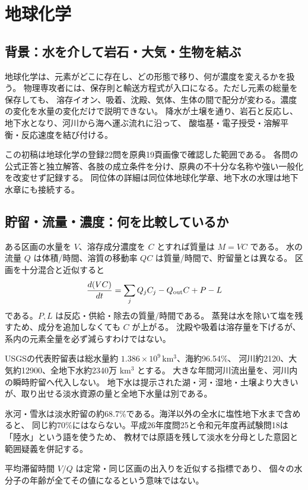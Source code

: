 \chapter{地球化学}
\section{背景：水を介して岩石・大気・生物を結ぶ}
\label{theory:geochemistry:boundary}
地球化学は、元素がどこに存在し、どの形態で移り、何が濃度を変えるかを扱う。
物理専攻者には、保存則と輸送方程式が入口になる。ただし元素の総量を保存しても、
溶存イオン、吸着、沈殿、気体、生体の間で配分が変わる。濃度の変化を水量の変化だけで説明できない。
降水が土壌を通り、岩石と反応し、地下水となり、河川から海へ運ぶ流れに沿って、
酸塩基・電子授受・溶解平衡・反応速度を結び付ける。

この初稿は地球化学の登録22問を原典19頁画像で確認した範囲である。
各問の公式正答と独立解答、各肢の成立条件を分け、原典の不十分な名称や強い一般化を改変せず記録する。
同位体の詳細は同位体地球化学章、地下水の水理は地下水章にも接続する。

\section{貯留・流量・濃度：何を比較しているか}
\label{theory:geochemistry:reservoir}
ある区画の水量を \(V\)、溶存成分濃度を \(C\) とすれば質量は \(M=VC\) である。
水の流量 \(Q\) は体積/時間、溶質の移動率 \(QC\) は質量/時間で、貯留量とは異なる。
区画を十分混合と近似すると
\[
 \frac{d(VC)}{dt}=\sum_j Q_jC_j-Q_{\rm out}C+P-L
\]
である。\(P,L\) は反応・供給・除去の質量/時間である。
蒸発は水を除いて塩を残すため、成分を追加しなくても \(C\) が上がる。
沈殿や吸着は溶存量を下げるが、系内の元素全量を必ず減らすわけではない。

USGSの代表貯留表は総水量約 \(1.386\times10^9\,\mathrm{km^3}\)、海約96.54\%、
河川約2120、大気約12900、全地下水約2340万 \(\mathrm{km^3}\) とする\cite{gc_water}。
大きな年間河川流出量を、河川内の瞬時貯留へ代入しない。
地下水は提示された湖・河・湿地・土壌より大きいが、取り出せる淡水資源の量と全地下水量は別である。
\begin{tcolorbox}[title=「約70\%」の分母]
氷河・雪氷は淡水貯留の約68.7\%である。海洋以外の全水に塩性地下水まで含めると、
同じ約70\%にはならない。平成26年度問25と令和元年度再試験問18は「陸水」という語を使うため、
教材では原語を残して淡水を分母とした意図と範囲疑義を併記する。
\end{tcolorbox}
平均滞留時間 \(V/Q\) は定常・同じ区画の出入りを近似する指標であり、
個々の水分子の年齢が全てその値になるという意味ではない。

